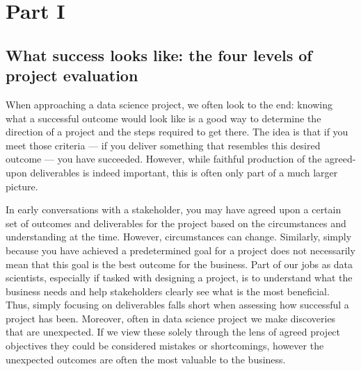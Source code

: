 \documentclass[
]{book}
\begin{document}
\hypertarget{part-part-i}{%
\part*{Part I}\label{part-part-i}}

\hypertarget{levels}{%
\chapter{What success looks like: the four levels of project evaluation}\label{levels}}

When approaching a data science project, we often look to the end: knowing what a successful outcome would look like is a good way to determine the direction of a project and the steps required to get there. The idea is that if you meet those criteria --- if you deliver something that resembles this desired outcome --- you have succeeded. However, while faithful production of the agreed-upon deliverables is indeed important, this is often only part of a much larger picture.

In early conversations with a stakeholder, you may have agreed upon a certain set of outcomes and deliverables for the project based on the circumstances and understanding at the time. However, circumstances can change. Similarly, simply because you have achieved a predetermined goal for a project does not necessarily mean that this goal is the best outcome for the business. Part of our jobs as data scientists, especially if tasked with designing a project, is to understand what the business needs and help stakeholders clearly see what is the most beneficial. Thus, simply focusing on deliverables falls short when assessing how successful a project has been. Moreover, often in data science project we make discoveries that are unexpected. If we view these solely through the lens of agreed project objectives they could be considered mistakes or shortcomings, however the unexpected outcomes are often the most valuable to the business.
\end{document}
